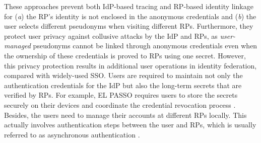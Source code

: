 These approaches prevent both IdP-based tracing and RP-based identity linkage for (\emph{a}) the RP's identity is not enclosed in the anonymous credentials and (\emph{b}) the user selects different pseudonyms when visiting different RPs.
Furthermore, they protect user privacy against collusive attacks by the IdP and RPs, as \emph{user-managed} pseudonyms cannot be linked through anonymous credentials \cite{anon-credential-2001, idemix, anon-credential} even when the ownership of these credentials is proved to RPs using one secret.
\newc
However, this privacy protection results in additional user operations in identity federation, compared with widely-used SSO.
Users are required to maintain not only the authentication credentials for the IdP but also the long-term secrets that are verified by RPs.
\oldc
For example, EL PASSO \cite{ELPASSO} requires users to store the secrets securely on their devices and coordinate the credential revocation process \cite{ELPASSO, UnlimitID}.
Besides, the users need to manage their accounts at different RPs locally. This actually involves authentication steps between the user and RPs, which is usually referred to as asynchronous authentication \cite{ELPASSO}.




